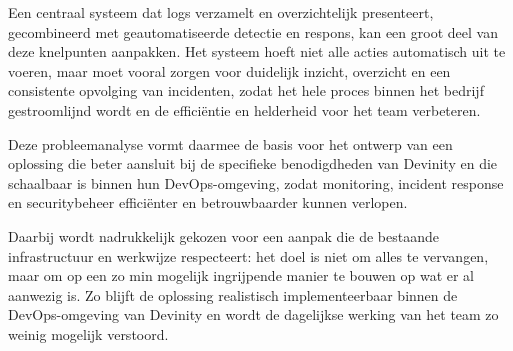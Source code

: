Een centraal systeem dat logs verzamelt en overzichtelijk presenteert, gecombineerd met geautomatiseerde detectie en respons, kan een groot deel van deze knelpunten aanpakken. Het systeem hoeft niet alle acties automatisch uit te voeren, maar moet vooral zorgen voor duidelijk inzicht, overzicht en een consistente opvolging van incidenten, zodat het hele proces binnen het bedrijf gestroomlijnd wordt en de efficiëntie en helderheid voor het team verbeteren.

Deze probleemanalyse vormt daarmee de basis voor het ontwerp van een oplossing die beter aansluit bij de specifieke benodigdheden van Devinity en die schaalbaar is binnen hun DevOps-omgeving, zodat monitoring, incident response en securitybeheer efficiënter en betrouwbaarder kunnen verlopen.

Daarbij wordt nadrukkelijk gekozen voor een aanpak die de bestaande infrastructuur en werkwijze respecteert: het doel is niet om alles te vervangen, maar om op een zo min mogelijk ingrijpende manier te bouwen op wat er al aanwezig is. Zo blijft de oplossing realistisch implementeerbaar binnen de DevOps-omgeving van Devinity en wordt de dagelijkse werking van het team zo weinig mogelijk verstoord.